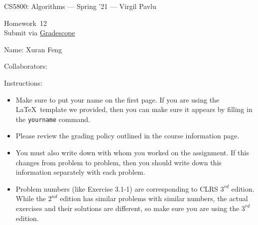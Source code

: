\documentclass[11pt]{article}
\newcommand{\yourcollaborators}{}
\theoremstyle{definition}
\newcommand{\instructor}{Virgil Pavlu}
\newcommand{\hwnum}{12}
\theoremstyle{theorem}
\begin{document}
{\Large 
\begin{center}{CS5800: Algorithms} --- Spring '21 --- \instructor \end{center}}
{\large
\vspace{10pt}
\noindent Homework~\hwnum \vspace{2pt}\\
Submit via \href{https://www.gradescope.com/courses/232127}{Gradescope}}

\bigskip
{\large \noindent Name: Xuran Feng }

{\large \noindent Collaborators: \yourcollaborators}

\vspace{15pt}

{\large \noindent Instructions:}

\begin{itemize}

\item Make sure to put your name on the first page.  If you are using the \LaTeX~template we provided, then you can make sure it appears by filling in the \texttt{yourname} command.

\item Please review the grading policy outlined in the course information page.

\item You must also write down with whom you worked on the assignment.  If this changes from problem to problem, then you should write down this information separately with each problem.

\item Problem numbers (like Exercise 3.1-1) are corresponding to CLRS $3^{rd}$ edition.  While the  $2^{nd}$ edition  has  similar  problems  with  similar  numbers,  the  actual  exercises  and their solutions are different, so make sure you are using the $3^{rd}$ edition.

\end{itemize}

\newpage
\end{document}
